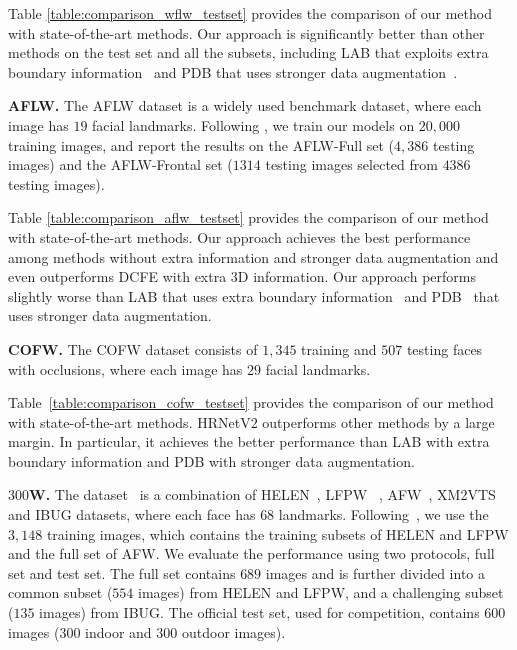 \documentclass[10pt,journal,compsoc]{IEEEtran}
\begin{document}
Table \ref{table:comparison_wflw_testset} provides the comparison of our method with state-of-the-art methods. 
Our approach is significantly better than other methods on the test set and all the subsets,
including LAB that exploits extra boundary information~\cite{Wu0YWC018} and PDB that uses stronger data augmentation~\cite{FengKA0W18}.

\vspace{.1cm}
\noindent\textbf{AFLW.}
The AFLW \cite{KostingerWRB11} dataset is
a widely used benchmark dataset,
where each image has $19$ facial landmarks. Following \cite{ZhuLLT15, Wu0YWC018}, we train our models on $20,000$ training images, and report the results on the AFLW-Full set ($4,386$ testing images) and the AFLW-Frontal set ($1314$ testing images selected from $4386$ testing images).


Table \ref{table:comparison_aflw_testset} provides the comparison of our method with state-of-the-art methods. 
Our approach achieves the best performance among methods without extra information and stronger data augmentation and even outperforms DCFE with extra $3$D information. 
Our approach performs slightly worse than
LAB that uses extra boundary information~\cite{Wu0YWC018}
and PDB~\cite{FengKA0W18}
that uses stronger data augmentation.

\vspace{.1cm}
\noindent\textbf{COFW.}
The COFW dataset \cite{Burgos-ArtizzuPD13} 
consists of $1,345$ training
and $507$ testing faces
with occlusions,
where each image has $29$ facial landmarks.

Table~\ref{table:comparison_cofw_testset} provides the comparison of our method with state-of-the-art methods. 
HRNetV$2$ outperforms other methods by a large margin.
In particular, it achieves the better performance than LAB with
extra boundary information and PDB with stronger data augmentation.


\vspace{.1cm}
\noindent\textbf{$300$W.}
The dataset~\cite{SagonasTZP13} is a combination
of HELEN~\cite{LeBLBH12}, LFPW ~\cite{BelhumeurJKK13}, AFW~\cite{ZhuR12}, XM2VTS~ and IBUG datasets,
where each face has $68$ landmarks. 
Following~\cite{RenCWS16}, we use the $3,148$ training images, which
contains the training subsets of HELEN and LFPW and the full set of AFW. 
We evaluate the performance
using two protocols, full set and test set. 
The full set contains $689$ images and is further divided
into a common subset ($554$ images) from HELEN and LFPW, and a challenging subset
($135$ images) from IBUG. 
The official test set, used for competition,  contains $600$ images ($300$ indoor and $300$ outdoor images).
\end{document}
